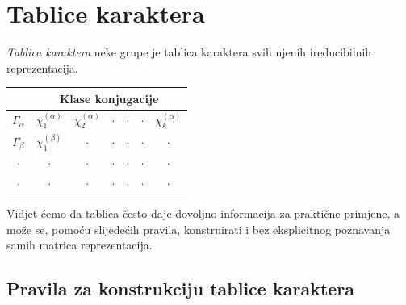 \section{Tablice karaktera}
\label{sec:karakteri}

\emph{Tablica karaktera} neke grupe je tablica karaktera svih njenih
ireducibilnih reprezentacija.  
\begin{center}
    \setlength{\tabcolsep}{12pt}
    \renewcommand{\arraystretch}{2.0}
\begin{tabular}{c|cccccc}
               & \multicolumn{6}{c}{Klase konjugacije} \\ \hline
  $\Gamma_{\alpha}$ & $\chi_{1}^{(\alpha)}$ & $\chi_{2}^{(\alpha)}$ & $\cdot$ &
       $\cdot$ & $\cdot$ & $\chi_{k}^{(\alpha)}$ \\
  $\Gamma_{\beta}$  & $\chi_{1}^{(\beta)}$  & $\cdot$ & $\cdot$ & $\cdot$ & $\cdot$  & $\cdot$ \\
     $\cdot$ &  $\cdot$   & $\cdot$ & $\cdot$ & $\cdot$ & $\cdot$  & $\cdot$ \\
     $\cdot$ &  $\cdot$   & $\cdot$ & $\cdot$ & $\cdot$ & $\cdot$  & $\cdot$ \\
\end{tabular}
    \renewcommand{\arraystretch}{1.0}
\end{center}
Vidjet ćemo da tablica često daje dovoljno informacija za praktične primjene, a može
se, pomoću slijedećih pravila, konstruirati i bez eksplicitnog
poznavanja samih matrica reprezentacija.


\subsection*{Pravila za konstrukciju tablice karaktera}


